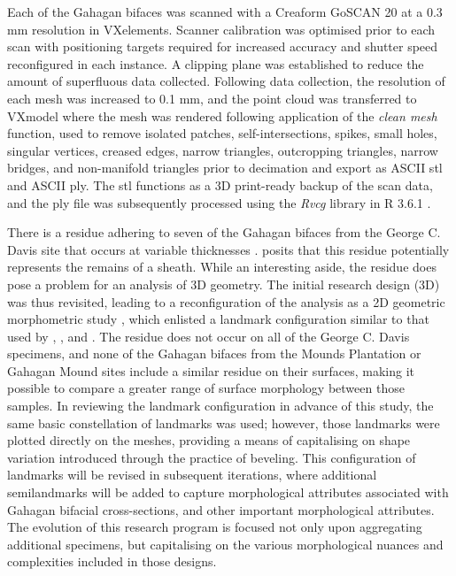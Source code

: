 \documentclass[review]{elsarticle}
\begin{document}
Each of the Gahagan bifaces was scanned with a Creaform GoSCAN 20 at a 0.3 mm resolution in VXelements. Scanner calibration was optimised prior to each scan with positioning targets required for increased accuracy and shutter speed reconfigured in each instance. A clipping plane was established to reduce the amount of superfluous data collected. Following data collection, the resolution of each mesh was increased to 0.1 mm, and the point cloud was transferred to VXmodel where the mesh was rendered following application of the \textit{clean mesh} function, used to remove isolated patches, self-intersections, spikes, small holes, singular vertices, creased edges, narrow triangles, outcropping triangles, narrow bridges, and non-manifold triangles prior to decimation and export as ASCII stl and ASCII ply. The stl functions as a 3D print-ready backup of the scan data, and the ply file was subsequently processed using the \textit{Rvcg} library in R 3.6.1 \citep{RN20849,R,RN20850}.

There is a residue adhering to seven of the Gahagan bifaces from the George C. Davis site that occurs at variable thicknesses \citep[Figure 2]{RN11783}. \citet[228]{RN3684} posits that this residue potentially represents the remains of a sheath. While an interesting aside, the residue does pose a problem for an analysis of 3D geometry. The initial research design (3D) was thus revisited, leading to a reconfiguration of the analysis as a 2D geometric morphometric study \citep{RN11783}, which enlisted a landmark configuration similar to that used by \citet[Figure 2]{RN1754}, \citet[Figure 2]{RN1736}, and \citet[Figure 1]{RN11731}. The residue does not occur on all of the George C. Davis specimens, and none of the Gahagan bifaces from the Mounds Plantation or Gahagan Mound sites include a similar residue on their surfaces, making it possible to compare a greater range of surface morphology between those samples. In reviewing the landmark configuration in advance of this study, the same basic constellation of landmarks was used; however, those landmarks were plotted directly on the meshes, providing a means of capitalising on shape variation introduced through the practice of beveling. This configuration of landmarks will be revised in subsequent iterations, where additional semilandmarks will be added to capture morphological attributes associated with Gahagan bifacial cross-sections, and other important morphological attributes. The evolution of this research program is focused not only upon aggregating additional specimens, but capitalising on the various morphological nuances and complexities included in those designs.
\end{document}
